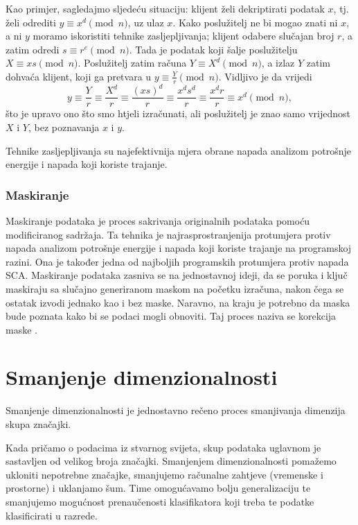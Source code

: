 \documentclass[times, utf8, diplomski]{fer}
\begin{document}
Kao primjer, sagledajmo sljedeću situaciju: klijent želi dekriptirati podatak \(x\), tj. želi odrediti \(y \equiv x^d \pmod{n}\), uz ulaz \(x\). Kako poslužitelj ne bi mogao znati ni \(x\), a ni \(y\) moramo iskoristiti tehnike zasljepljivanja; klijent odabere slučajan broj \(r\), a zatim odredi \(s \equiv r^e \pmod{n} \). Tada je podatak koji šalje poslužitelju \( X \equiv xs \pmod{n}\). Poslužitelj zatim računa \(Y \equiv X^d \pmod{n}\), a izlaz \(Y\) zatim dohvaća klijent, koji ga pretvara u \(y \equiv \frac{Y}{r} \pmod{n}\). Vidljivo je da vrijedi
\begin{equation}
    y \equiv
    \frac{Y}{r} \equiv
    \frac{X^d}{r} \equiv
    \frac{(xs)^d}{r} \equiv
    \frac{x^d s^d}{r} \equiv
    \frac{x^d r}{r} \equiv
    x^d \pmod{n},
\end{equation}
što je upravo ono što smo htjeli izračunati, ali poslužitelj je znao samo vrijednost \(X\) i \(Y\), bez poznavanja \(x\) i \(y\).

Tehnike zasljepljivanja su najefektivnija mjera obrane napada analizom potrošnje energije i napada koji koriste trajanje.

\subsection{Maskiranje}

Maskiranje podataka je proces sakrivanja originalnih podataka pomoću modificiranog sadržaja. Ta tehnika je najrasprostranjenija protumjera protiv  napada analizom potrošnje energije i napada koji koriste trajanje na programskoj razini. Ona je također jedna od najboljih programskih protumjera protiv napada SCA. Maskiranje podataka zasniva se na jednostavnoj ideji, da se poruka i ključ maskiraju sa slučajno generiranom maskom na početku izračuna, nakon čega se ostatak izvodi jednako kao i bez maske. Naravno, na kraju je potrebno da maska bude poznata kako bi se podaci mogli obnoviti. Taj proces naziva se korekcija maske .

\chapter{Smanjenje dimenzionalnosti}

Smanjenje dimenzionalnosti  je jednostavno rečeno proces smanjivanja dimenzija skupa značajki.

Kada pričamo o podacima iz stvarnog svijeta, skup podataka uglavnom je sastavljen od velikog broja značajki. Smanjenjem dimenzionalnosti pomažemo ukloniti nepotrebne značajke, smanjujemo računalne zahtjeve (vremenske i prostorne) i uklanjamo šum. Time omogućavamo bolju generalizaciju te smanjujemo mogućnost prenaučenosti  klasifikatora koji treba te podatke klasificirati u razrede.
\end{document}
